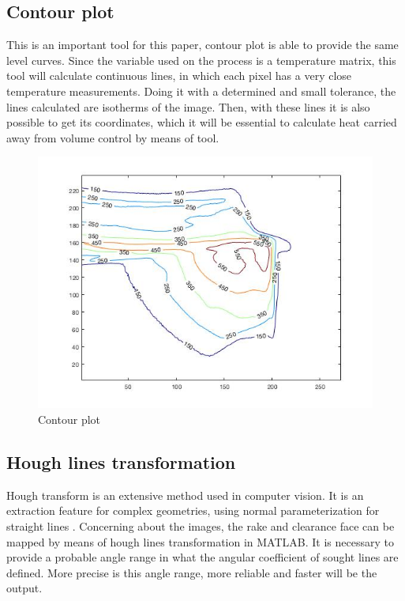 	\subsection{Contour plot}
	\label{ch:seccontour}
	This is an important tool for this paper, contour plot is able to provide the same level curves. Since the variable used on the process is a temperature matrix, this tool will calculate continuous lines, in which each pixel has a very close temperature measurements. Doing it with a determined and small tolerance, the lines calculated are isotherms of the image. Then, with these lines it is also possible to get its coordinates, which it will be essential to calculate heat carried away from volume control by means of tool.

	\begin{figure}[H]
		\centering
		\captionsetup{justification=centering}
		\includegraphics[scale=0.6]{Cap4/contour.jpg}
		\caption{Contour plot}
		\label{fig:contour}
	\end{figure}

	\subsection{Hough lines transformation}
	\label{ch:sechough}
	Hough transform is an extensive method used in computer vision. It is an extraction feature for complex geometries, using normal parameterization for straight lines \cite{duda1972use}. Concerning about the images, the rake and clearance face can be mapped by means of hough lines transformation in MATLAB. It is necessary to provide a probable angle range in what the angular coefficient of sought lines are defined. More precise is this angle range, more reliable and faster will be the output.

